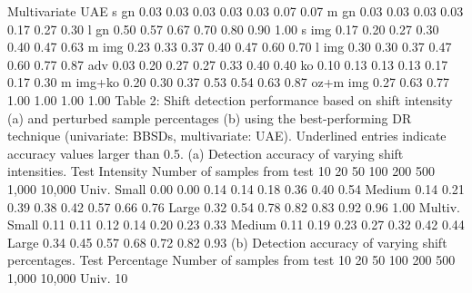 \documentclass[12pt]{report}
\begin{document}
Multivariate UAE s gn 0.03 0.03 0.03 0.03 0.03 0.07 0.07 m gn 0.03 0.03 0.03 0.03 0.17 0.27 0.30 l gn 0.50 0.57 0.67 0.70 0.80 0.90 1.00 s img 0.17 0.20 0.27 0.30 0.40 0.47 0.63 m img 0.23 0.33 0.37 0.40 0.47 0.60 0.70 l img 0.30 0.30 0.37 0.47 0.60 0.77 0.87 adv 0.03 0.20 0.27 0.27 0.33 0.40 0.40 ko 0.10 0.13 0.13 0.13 0.17 0.17 0.30 m img+ko 0.20 0.30 0.37 0.53 0.54 0.63 0.87 oz+m img 0.27 0.63 0.77 1.00 1.00 1.00 1.00 Table 2: Shift detection performance based on shift intensity (a) and perturbed sample percentages (b) using the best-performing DR technique (univariate: BBSDs, multivariate: UAE). Underlined entries indicate accuracy values larger than 0.5. (a) Detection accuracy of varying shift intensities. Test Intensity Number of samples from test 10 20 50 100 200 500 1,000 10,000 Univ. Small 0.00 0.00 0.14 0.14 0.18 0.36 0.40 0.54 Medium 0.14 0.21 0.39 0.38 0.42 0.57 0.66 0.76 Large 0.32 0.54 0.78 0.82 0.83 0.92 0.96 1.00 Multiv. Small 0.11 0.11 0.12 0.14 0.20 0.23 0.33 Medium 0.11 0.19 0.23 0.27 0.32 0.42 0.44 Large 0.34 0.45 0.57 0.68 0.72 0.82 0.93 (b) Detection accuracy of varying shift percentages. Test Percentage Number of samples from test 10 20 50 100 200 500 1,000 10,000 Univ. 10%
\end{document}
